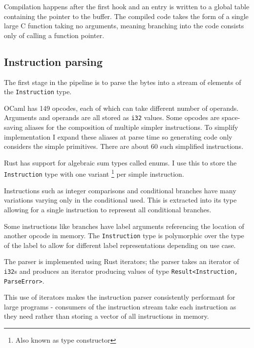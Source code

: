 Compilation happens after the first hook and an entry is written to a global table containing the
pointer to the buffer. The compiled code takes the form of a single large C function taking no
arguments, meaning branching into the code consists only of calling a function pointer.

\subsection{Instruction parsing}

The first stage in the pipeline is to parse the bytes into a stream of elements of the
\texttt{Instruction} type.

\label{instruction-type}

OCaml has 149 opcodes, each of which can take different number of operands. Arguments and operands
are all stored as \texttt{i32} values. Some opcodes are space-saving aliases for the composition of
multiple simpler instructions. To simplify implementation I expand these aliases at parse time so
generating code only considers the simple primitives. There are about 60 such simplified
instructions.

Rust has support for algebraic sum types called enums. I use this to store the \texttt{Instruction}
type with one variant \footnote{Also known as type constructor} per simple instruction.

Instructions such as integer comparisons and conditional branches have many variations varying only
in the conditional used. This is extracted into its type allowing for a single instruction to
represent all conditional branches.

Some instructions like branches have label arguments referencing the location of another opcode in
memory. The \texttt{Instruction} type is polymorphic over the type of the label to allow for
different label representations depending on use case.


The parser is implemented using Rust iterators; the parser takes an iterator of \texttt{i32}s and
produces an iterator producing values of type \texttt{Result<Instruction, ParseError>}.

This use of iterators makes the instruction parser consistently performant for large programs -
consumers of the instruction stream take each instruction as they need rather than storing
a vector of all instructions in memory.


